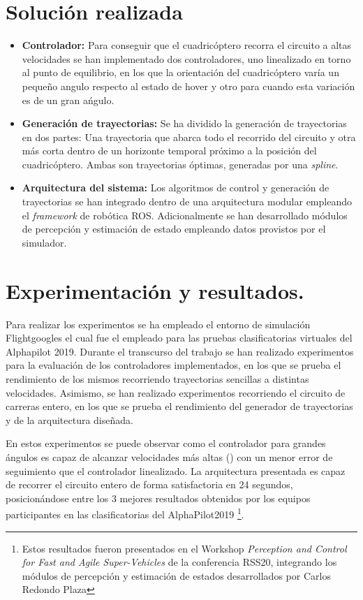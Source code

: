 \section*{Solución realizada}
\begin{itemize}
\item \textbf{Controlador:}
Para conseguir que el cuadricóptero recorra el circuito a altas velocidades se han implementado dos controladores, uno linealizado en torno al punto de equilibrio, en los que la orientación del cuadricóptero varía un pequeño angulo respecto al estado de hover y otro para cuando esta variación es de un gran ańgulo.

\item \textbf{Generación de trayectorias:} Se ha dividido la generación de trayectorias en dos partes:
Una trayectoria que abarca todo el recorrido del circuito y otra más corta dentro de un horizonte temporal próximo a la posición del cuadricóptero. Ambas son trayectorias óptimas, generadas por una \textit{spline}.

\item \textbf{Arquitectura del sistema:} Los algoritmos de control y generación de trayectorias se han integrado dentro de una arquitectura modular empleando el \textit{framework} de robótica ROS. Adicionalmente se han desarrollado módulos de percepción y estimación de estado empleando datos provistos por el simulador.

\end{itemize}
	

\section*{Experimentación y resultados.}

Para realizar los experimentos se ha empleado el entorno de simulación Flightgoogles   el cual fue el empleado para las pruebas clasificatorias virtuales del Alphapilot 2019. Durante el transcurso del trabajo se han realizado experimentos para la evaluación de los controladores implementados, en los que se prueba el rendimiento de los mismos recorriendo trayectorias sencillas a distintas velocidades. Asimismo, se han realizado experimentos recorriendo el circuito de carreras entero, en los que se prueba el rendimiento del generador de trayectorias y de la arquitectura diseñada.

En estos experimentos se puede observar como el controlador para grandes ángulos es capaz de alcanzar velocidades más altas () con un menor error de seguimiento que el controlador linealizado. La arquitectura presentada es capaz de recorrer el circuito entero de forma satisfactoria en 24 segundos, posicionándose entre los 3 mejores resultados obtenidos por los equipos participantes en las clasificatorias del AlphaPilot2019 \footnote{Estos resultados fueron presentados en el Workshop  \textit{Perception and Control for Fast and Agile Super-Vehicles} de la conferencia RSS20, integrando los módulos de percepción y estimación de estados desarrollados por Carlos Redondo Plaza}.


